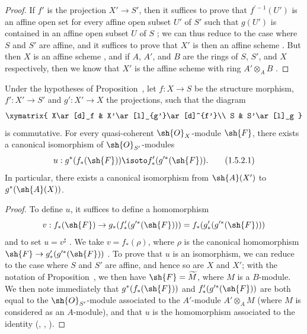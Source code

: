 \begin{proof}
If $f'$ is the projection $X'\to S'$, then it suffices to prove that $f^{\prime-1}(U')$ is an affine open set for every affine open subset $U'$ of $S'$ such that $g(U')$ is contained in an affine open subset $U$ of $S$ ; we can thus reduce to the case where $S$ and $S'$ are affine, and it suffices to prove that $X'$ is then an affine scheme .
But then $X$ is an affine scheme , and if $A$, $A'$, and $B$ are the rings of $S$, $S'$, and $X$ respectively, then we know that $X'$ is the affine scheme with ring $A'\otimes_A B$ .
\end{proof}

\begin{corollary}[1.5.2]
\label{II.1.5.2}
Under the hypotheses of Proposition~, let $f:X\to S$ be the structure morphism, $f':X'\to S'$ and $g':X'\to X$ the projections, such that the diagram
\[
  \xymatrix{
    X\ar[d]_f &
    X'\ar[l]_{g'}\ar[d]^{f'}\\
    S &
    S'\ar[l]_g
  }
\]
is commutative.
For every quasi-coherent $\sh{O}_X$-module $\sh{F}$, there exists a canonical isomorphism of $\sh{O}_{S'}$-modules
\[
\label{II.1.5.2.1}
  u:g^*(f_*(\sh{F}))\isoto f'_*(g^{\prime*}(\sh{F})).
  \tag{1.5.2.1}
\]
In particular, there exists a canonical isomorphism from $\sh{A}(X')$ to $g^*(\sh{A}(X))$.
\end{corollary}

\begin{proof}
To define $u$, it suffices to define a homomorphism
\[
  v:f_*(\sh{F})\to g_*(f'_*(g^{\prime*}(\sh{F})))=f_*(g'_*(g^{\prime*}(\sh{F})))
\]
and to set $u=v^\sharp$ .
We take $v=f_*(\rho)$, where $\rho$ is the canonical homomorphism $\sh{F}\to g'_*(g^{\prime*}(\sh{F}))$ .
To prove that $u$ is an isomorphism, we can reduce to the case where $S$ and $S'$ are affine, and hence so are $X$ and $X'$; with the notation of Proposition~, we then have $\sh{F}=\widetilde{M}$, where $M$ is a $B$-module.
We then note immediately that $g^*(f_*(\sh{F}))$ and $f'_*(g^{\prime*}(\sh{F}))$ are both equal to the $\sh{O}_{S'}$-module associated to the $A'$-module $A'\otimes_A M$ (where $M$ is considered as an $A$-module), and that $u$ is the homomorphism associated to the identity (, , ).
\end{proof}

